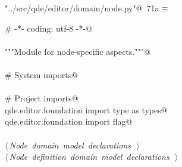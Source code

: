 \documentclass[
    a4paper,      %
    10pt,         %
    openright,    %
    notitlepage,  %
    parskip=half, %
]{scrreprt}       %
\theoremstyle{definition}                    %
\begin{document}
\begin{flushleft} \small
\begin{minipage}{\linewidth}\label{scrap122}\raggedright\small
{} \verb@"../src/qde/editor/domain/node.py"@\nobreak\ {\footnotesize {71a}}$\equiv$
\vspace{-1ex}
\begin{list}{}{} \item
\mbox{}\lstinline@# -*- coding: utf-8 -*-@\\
\mbox{}\lstinline@@\\
\mbox{}\lstinline@"""Module for node-specific aspects."""@\\
\mbox{}\lstinline@@\\
\mbox{}\lstinline@# System imports@\\
\mbox{}\lstinline@@\\
\mbox{}\lstinline@# Project imports@\\
\mbox{}\lstinline@from qde.editor.foundation import type as types@\\
\mbox{}\lstinline@from qde.editor.foundation import flag@\\
\mbox{}\lstinline@@\\
\mbox{}\lstinline@@\hbox{$\langle\,${\itshape Node domain model declarations}\nobreak\ {\footnotesize {}}$\,\rangle$}\lstinline@@\\
\mbox{}\lstinline@@\hbox{$\langle\,${\itshape Node definition domain model declarations}\nobreak\ {\footnotesize {}}$\,\rangle$}\lstinline@@\\
\mbox{}\lstinline@@{\NWsep}
\end{list}
\vspace{-1.5ex}
\footnotesize
\begin{list}{}{\setlength{\itemsep}{-\parsep}\setlength{\itemindent}{-\leftmargin}}

\item{}
\end{list}
\end{minipage}\vspace{4ex}
\end{flushleft}
\end{document}
